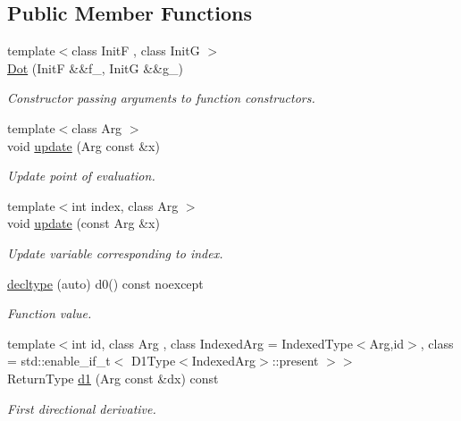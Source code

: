 \subsection*{\-Public \-Member \-Functions}
\begin{DoxyCompactItemize}
\item 
{\footnotesize template$<$class Init\-F , class Init\-G $>$ }\\\hyperlink{structFunG_1_1MathematicalOperations_1_1Dot_a00296551bc83a77626503ef10e509de7}{\-Dot} (\-Init\-F \&\&f\-\_\-, \-Init\-G \&\&g\-\_\-)
\begin{DoxyCompactList}\small\item\em \-Constructor passing arguments to function constructors. \end{DoxyCompactList}\item 
{\footnotesize template$<$class Arg $>$ }\\void \hyperlink{structFunG_1_1MathematicalOperations_1_1Dot_a76ef6519450242a03fea26fe0671c8af}{update} (\-Arg const \&x)
\begin{DoxyCompactList}\small\item\em \-Update point of evaluation. \end{DoxyCompactList}\item 
{\footnotesize template$<$int index, class Arg $>$ }\\void \hyperlink{structFunG_1_1MathematicalOperations_1_1Dot_a9b75f8b451473b48f2a35ba2319d5287}{update} (const \-Arg \&x)
\begin{DoxyCompactList}\small\item\em \-Update variable corresponding to index. \end{DoxyCompactList}\item 
\hyperlink{structFunG_1_1MathematicalOperations_1_1Dot_abbc25cba6b3a4407379911c6987c3410}{decltype} (auto) d0() const noexcept
\begin{DoxyCompactList}\small\item\em \-Function value. \end{DoxyCompactList}\item 
{\footnotesize template$<$int id, class Arg , class Indexed\-Arg  = \-Indexed\-Type$<$\-Arg,id$>$, class  = std\-::enable\-\_\-if\-\_\-t$<$ D1\-Type$<$\-Indexed\-Arg$>$\-::present $>$$>$ }\\\-Return\-Type \hyperlink{structFunG_1_1MathematicalOperations_1_1Dot_a5539a338fdd0ab52307bdca4bc5c0906}{d1} (\-Arg const \&dx) const 
\begin{DoxyCompactList}\small\item\em \-First directional derivative. \end{DoxyCompactList}\item 

\end{DoxyCompactItemize}
